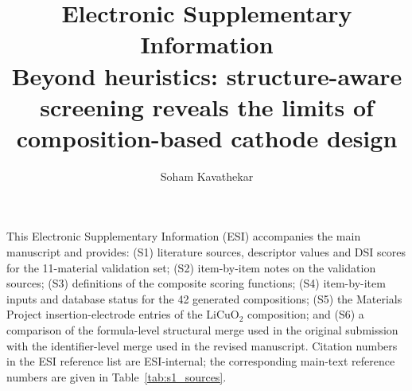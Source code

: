 \documentclass[10pt]{article}
\title{Electronic Supplementary Information\\
\large Beyond heuristics: structure-aware screening reveals the limits of
composition-based cathode design}
\author{Soham Kavathekar}
\date{}
\begin{document}
\maketitle

\noindent This Electronic Supplementary Information (ESI) accompanies the main manuscript and provides: (S1) literature sources, descriptor values and DSI scores for the 11-material validation set; (S2) item-by-item notes on the validation sources; (S3) definitions of the composite scoring functions; (S4) item-by-item inputs and database status for the 42 generated compositions; (S5) the Materials Project insertion-electrode entries of the LiCuO$_2$ composition; and (S6) a comparison of the formula-level structural merge used in the original submission with the identifier-level merge used in the revised manuscript. Citation numbers in the ESI reference list are ESI-internal; the corresponding main-text reference numbers are given in Table~\ref{tab:s1_sources}.

\vspace{1em}
\end{document}
